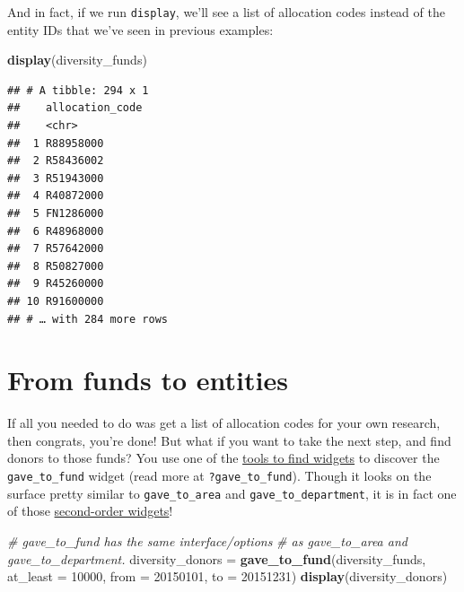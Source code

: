 \documentclass[]{book}
\newenvironment{Shaded}{\begin{snugshade}}{\end{snugshade}}
\newcommand{\CommentTok}[1]{\textcolor[rgb]{0.56,0.35,0.01}{\textit{#1}}}
\newcommand{\DataTypeTok}[1]{\textcolor[rgb]{0.13,0.29,0.53}{#1}}
\newcommand{\DecValTok}[1]{\textcolor[rgb]{0.00,0.00,0.81}{#1}}
\newcommand{\KeywordTok}[1]{\textcolor[rgb]{0.13,0.29,0.53}{\textbf{#1}}}
\newcommand{\NormalTok}[1]{#1}
\newcommand{\StringTok}[1]{\textcolor[rgb]{0.31,0.60,0.02}{#1}}
\begin{document}
And in fact, if we run \texttt{display}, we'll see a list of allocation codes instead of the entity IDs that we've seen in previous examples:

\begin{Shaded}
\begin{Highlighting}[]
\KeywordTok{display}\NormalTok{(diversity_funds)}
\end{Highlighting}
\end{Shaded}

\begin{verbatim}
## # A tibble: 294 x 1
##    allocation_code
##    <chr>          
##  1 R88958000      
##  2 R58436002      
##  3 R51943000      
##  4 R40872000      
##  5 FN1286000      
##  6 R48968000      
##  7 R57642000      
##  8 R50827000      
##  9 R45260000      
## 10 R91600000      
## # … with 284 more rows
\end{verbatim}

\hypertarget{from-funds-to-entities}{%
\section{From funds to entities}\label{from-funds-to-entities}}

If all you needed to do was get a list of allocation codes for your own research, then congrats, you're done! But what if you want to take the next step, and find donors to those funds? You use one of the \protect\hyperlink{working-with-finding-widgets}{tools to find widgets} to discover the \texttt{gave\_to\_fund} widget (read more at \texttt{?gave\_to\_fund}). Though it looks on the surface pretty similar to \texttt{gave\_to\_area} and \texttt{gave\_to\_department}, it is in fact one of those \protect\hyperlink{higher-order-widgets}{second-order widgets}!

\begin{Shaded}
\begin{Highlighting}[]
\CommentTok{# gave_to_fund has the same interface/options }
\CommentTok{# as gave_to_area and gave_to_department. }
\NormalTok{diversity_donors =}\StringTok{ }\KeywordTok{gave_to_fund}\NormalTok{(diversity_funds, }\DataTypeTok{at_least =} \DecValTok{10000}\NormalTok{,}
                                \DataTypeTok{from =} \DecValTok{20150101}\NormalTok{, }\DataTypeTok{to =} \DecValTok{20151231}\NormalTok{)}
\KeywordTok{display}\NormalTok{(diversity_donors)}
\end{Highlighting}
\end{Shaded}
\end{document}
